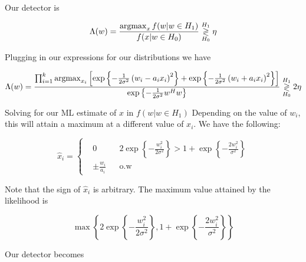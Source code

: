 \documentclass[english]{article}
\begin{document}
Our detector is

\begin{equation}
\Lambda(w) = \frac{\mathop{\rm argmax}_x f(w|w\in H_1)}{f(x|w\in H_0)}\overset{H_1}{\underset{H_0}{\gtrless}}\eta
\end{equation}

Plugging in our expressions for our distributions we have

\begin{equation}
\Lambda(w) = \frac{\prod_{i=1}^k\mathop{\rm argmax}_{x_i}\left[\exp\left\{-\frac{1}{2\sigma^2}\left(w_i-a_ix_i\right)^2\right\}+\exp\left\{-\frac{1}{2\sigma^2}\left(w_i+a_ix_i\right)^2\right\}\right]}{\exp\left\{-\frac{1}{2\sigma^2}w^Hw\right\}} \overset{H_1}{\underset{H_0}{\gtrless}} 2\eta
\end{equation}

Solving for our ML estimate of $x$ in $f(w|w\in H_1)$ Depending on the value of $w_i$, this will attain a maximum at a different value of $x_i$. We have the following:

\begin{equation}
\hat{x}_i=\left\{
\begin{aligned}
&0
&&2\exp\left\{-\frac{w_i^2}{2\sigma^2}\right\} > 1 + \exp\left\{-\frac{2w_i^2}{\sigma^2}\right\}\\
& \pm\frac{w_i}{a_i}
&& \text{o.w}
\end{aligned}
\right.
\end{equation}

Note that the sign of $\hat{x}_i$ is arbitrary. The maximum value attained by the likelihood is

\begin{equation}
\max\left\{2\exp\left\{-\frac{w_i^2}{2\sigma^2}\right\} , 1 + \exp\left\{-\frac{2w_i^2}{\sigma^2}\right\}\right\}
\end{equation}

Our detector becomes
\end{document}
